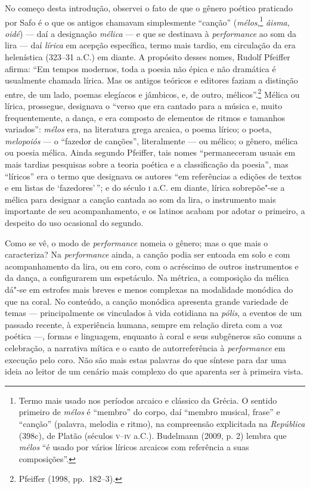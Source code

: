 No começo desta introdução, observei o fato de que o gênero poético praticado
por Safo é o que os antigos chamavam simplesmente “canção”
(\textit{mélos},\footnote{ Termo mais usado nos períodos arcaico e clássico da
Grécia. O sentido primeiro de \textit{mélos} é “membro” do corpo, daí “membro
musical, frase” e “canção” (palavra, melodia e ritmo), na compreensão
explicitada na \textit{República} (398c), de Platão (séculos \textsc{v}--\textsc{iv} a.C.).
Budelmann (2009, p. 2) lembra que \textit{mélos} “é usado por vários líricos
arcaicos com referência a suas composições”.} \textit{âisma, oidé}) --- daí a
designação \textit{mélica} --- e que se destinava à \textit{performance} ao som
da lira --- daí \textit{lírica} em acepção específica, termo mais tardio, em
circulação da era helenística (323--31 a.C.) em diante. A propósito
desses nomes, Rudolf Pfeiffer afirma: “Em tempos
modernos, toda a poesia não épica e não dramática é usualmente chamada lírica.
Mas os antigos teóricos e editores faziam a distinção entre, de um lado, poemas
elegíacos e jâmbicos, e, de outro, mélicos”.\footnote{ Pfeiffer (1998, pp.~182--3).} Mélica ou lírica, prossegue,
designava o “verso que era cantado para a música e, muito frequentemente, a
dança, e era composto de elementos de ritmos e tamanhos variados”:
\textit{mélos} era, na literatura grega arcaica, o poema lírico; o poeta,
\textit{melopoiós} --- o “fazedor de canções”, literalmente --- ou mélico; o
gênero, mélica ou poesia mélica. Ainda segundo Pfeiffer, tais nomes
“permaneceram usuais em mais tardias pesquisas sobre a teoria poética e a
classificação da poesia”, mas “líricos” era o termo que designava os autores
“em referências a edições de textos e em listas de ‘fazedores’\,”; e do século \textsc{i}
a.C. em diante, lírica sobrepõe"-se a mélica para designar a canção
cantada ao som da lira, o instrumento mais importante de seu acompanhamento, e
os latinos acabam por adotar o primeiro, a despeito do uso ocasional do
segundo.

Como se vê, o modo de \textit{performance} nomeia o gênero;
mas o que mais o caracteriza? Na \textit{performance} ainda, a canção podia ser
entoada em solo e com acompanhamento da lira, ou em coro, com o acréscimo de
outros instrumentos e da dança, a configurarem um espetáculo. Na métrica, a
composição da mélica dá"-se em estrofes mais breves e menos
complexas na modalidade monódica do que na coral. No conteúdo, a canção
monódica apresenta grande variedade de temas --- principalmente os vinculados à
vida cotidiana na \textit{pólis}, a eventos de um passado recente, à
experiência humana, sempre em relação direta com a voz poética ---, formas e
linguagem, enquanto à coral e seus subgêneros são comuns a celebração, a
narrativa mítica e o canto de autorreferência à \textit{performance} em
execução pelo coro. Não são mais estas palavras do que síntese para dar uma ideia ao leitor de um cenário mais complexo do que aparenta ser à primeira vista. 

